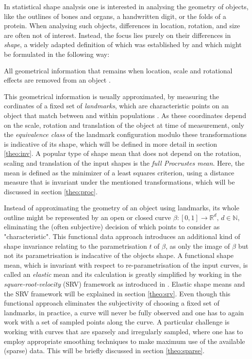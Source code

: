 In statistical shape analysis one is interested in analysing the geometry of
objects, like the outlines of bones and organs, a handwritten digit, or the
folds of a protein.
When analysing such objects, differences in location, rotation, and size
are often not of interest.
Instead, the focus lies purely on their differences in  \textit{shape}, a
widely adapted definition of which was established by \cite{Kendall1977} and which
might be formulated in the following way:
\begin{definition}[Shape] 
    All geometrical information that remains when location, scale
    and rotational effects are removed from an object 
    \parencite[see][1]{DrydenMardia2016}.
\end{definition}
\noindent This geometrical information is usually approximated, by measuring
the cordinates of a fixed set of \textit{landmarks}, which are characteristic
points on an object that match between and within populations
\parencite[see][3]{DrydenMardia2016}.
As these coordinates depend on the scale, rotation and translation of the
object at time of measurement, only the \textit{equivalence class} of the
landmark configuration modulo these transformations is indicative of its shape,
which will be defined in more detail in section \ref{theo:inv}.
A popular type of shape mean that does not depend on the rotation, scaling and
translation of the input shapes is the \textit{full Procrustes mean}.
Here, the mean is defined as the minimizer of a least squares criterion, using
a distance measure that is invariant under the mentioned transformations, which
will be discussed in section \ref{theo:proc}.

Instead of approximating the geometry of an object using landmarks, its whole
outline might be represented by an open or closed curve $\beta : [0,1]
\rightarrow \mathbb{R}^d,\, d \in \mathbb{N}$, eliminating the (often
subjective) decision of which points to consider as "characteristic".
This functional data approach introduces an additional kind of shape invariance
relating to the parametrisation $t$ of $\beta$, as only the image of
$\beta$ but not its parametrisation is indacative of the objects shape.
A functional shape mean, which is invariant with respect to re-parametrisation
of the input curves, is called an \textit{elastic} mean and its calculation is
greatly simplified by working in the \textit{square-root-velocity} (SRV)
framework as introduced in \cite{SrivastavaEtAl2011}.
Elastic shape means and the SRV framework will be explained in section
\ref{theo:srv}.
Even though this functional approach eliminates the subjectivity of choosing a
fixed set of landmarks, in practice, a curve will never be fully observed and
one has to again work with a set of sampled points along the curve. 
A particular challenge is working with curves that are sparsely and irregularly
sampled, where one has to employ appropriate smoothing techniques to make
maximum use of the available (sparse) data.
This will be briefly discussed in section \ref{theo:sparse}.

